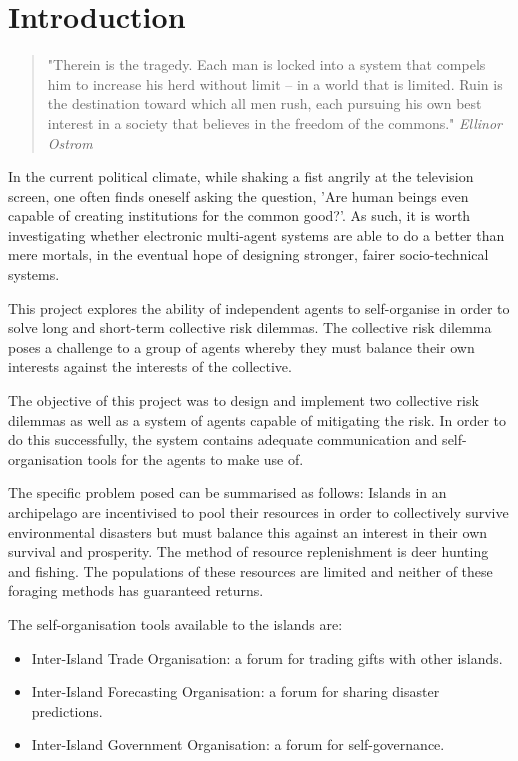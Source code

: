 \chapter{Introduction}

\begin{flushleft}
\begin{quote}
    "Therein is the tragedy. Each man is locked into a system that compels him to increase his herd without limit – in a world that is limited. Ruin is the destination toward which all men rush, each pursuing his own best interest in a society that believes in the freedom of the commons."
    \linebreak
    \emph{Ellinor Ostrom}
\end{quote}
\end{flushleft}

In the current political climate, while shaking a fist angrily at the television screen, one often finds oneself asking the question, 'Are human beings even capable of creating institutions for the common good?'. As such, it is worth investigating whether electronic multi-agent systems are able to do a better than mere mortals, in the eventual hope of designing stronger, fairer socio-technical systems.

This project explores the ability of independent agents to self-organise in order to solve long and short-term collective risk dilemmas. The collective risk dilemma poses a challenge to a group of agents whereby they must balance their own interests against the interests of the collective. 

The objective of this project was to design and implement two collective risk dilemmas as well as a system of agents capable of mitigating the risk. In order to do this successfully, the system contains adequate communication and self-organisation tools for the agents to make use of.

The specific problem posed can be summarised as follows: Islands in an archipelago are incentivised to pool their resources in order to collectively survive environmental disasters but must balance this against an interest in their own survival and prosperity. The method of resource replenishment is deer hunting and fishing. The populations of these resources are limited and neither of these foraging methods has guaranteed returns. 

The self-organisation tools available to the islands are:

\begin{itemize}
    \item Inter-Island Trade Organisation: a forum for trading gifts with other islands.
    \item Inter-Island Forecasting Organisation: a forum for sharing disaster predictions.
    \item Inter-Island Government Organisation: a forum for self-governance.
\end{itemize}
